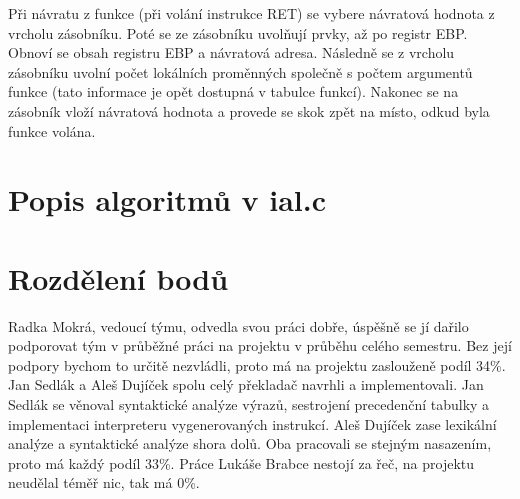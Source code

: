 \documentclass[a4paper,11pt,titlepage]{article}
\begin{document}
Při návratu z funkce (při volání instrukce RET) se vybere návratová hodnota z vrcholu zásobníku. Poté se ze zásobníku uvolňují prvky, až po registr EBP. Obnoví se obsah registru EBP a návratová adresa. Následně se z vrcholu zásobníku uvolní počet lokálních proměnných společně s počtem argumentů funkce (tato informace je opět dostupná v tabulce funkcí). Nakonec se na zásobník vloží návratová hodnota a provede se skok zpět na místo, odkud byla funkce volána.

\section{Popis algoritmů v ial.c}

\section{Rozdělení bodů}

Radka Mokrá, vedoucí týmu, odvedla svou práci dobře, úspěšně se jí dařilo podporovat tým v průběžné práci na projektu v průběhu celého semestru. Bez její podpory bychom to určitě nezvládli, proto má na projektu zaslouženě podíl 34\%. Jan Sedlák a Aleš Dujíček spolu celý překladač navrhli a implementovali. Jan Sedlák se věnoval syntaktické analýze výrazů, sestrojení precedenční tabulky a implementaci interpreteru vygenerovaných instrukcí. Aleš Dujíček zase lexikální analýze a syntaktické analýze shora dolů. Oba pracovali se stejným nasazením, proto má každý podíl 33\%. Práce Lukáše Brabce nestojí za řeč, na projektu neudělal téměř nic, tak má 0\%.
\end{document}
